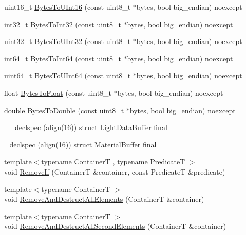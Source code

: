 \begin{DoxyCompactItemize}
\item 
uint16\+\_\+t \hyperlink{namespacemage_a5d362d71af09a61b69a77650037528a9}{Bytes\+To\+U\+Int16} (const uint8\+\_\+t $\ast$bytes, bool big\+\_\+endian) noexcept
\item 
int32\+\_\+t \hyperlink{namespacemage_a2262f4113dd6a3ec00789044d5408f78}{Bytes\+To\+Int32} (const uint8\+\_\+t $\ast$bytes, bool big\+\_\+endian) noexcept
\item 
uint32\+\_\+t \hyperlink{namespacemage_af9a93f8769633506fe457fc60d309540}{Bytes\+To\+U\+Int32} (const uint8\+\_\+t $\ast$bytes, bool big\+\_\+endian) noexcept
\item 
int64\+\_\+t \hyperlink{namespacemage_a0d8c7ac6d7820cf7d66eb80fb3dc2b74}{Bytes\+To\+Int64} (const uint8\+\_\+t $\ast$bytes, bool big\+\_\+endian) noexcept
\item 
uint64\+\_\+t \hyperlink{namespacemage_a59898cc480f29908c8e015c8aef5d342}{Bytes\+To\+U\+Int64} (const uint8\+\_\+t $\ast$bytes, bool big\+\_\+endian) noexcept
\item 
float \hyperlink{namespacemage_a0a2e3f535427f52fb248afbbaebdc610}{Bytes\+To\+Float} (const uint8\+\_\+t $\ast$bytes, bool big\+\_\+endian) noexcept
\item 
double \hyperlink{namespacemage_ae0813ad421fca47762e1c6b5b4f78ae7}{Bytes\+To\+Double} (const uint8\+\_\+t $\ast$bytes, bool big\+\_\+endian) noexcept
\item 
\hyperlink{namespacemage_acb52a2b7136d871548446f56ecb1b36c}{\+\_\+\+\_\+declspec} (align(16)) struct Light\+Data\+Buffer final
\item 
\hyperlink{namespacemage_a76dac28d69746bdef408a08c36a7c862}{\+\_\+declspec} (align(16)) struct Material\+Buffer final
\item 
{\footnotesize template$<$typename ContainerT , typename PredicateT $>$ }\\void \hyperlink{namespacemage_a403ff95eb779de1fbbf139661feb2d1b}{Remove\+If} (ContainerT \&container, const PredicateT \&predicate)
\item 
{\footnotesize template$<$typename ContainerT $>$ }\\void \hyperlink{namespacemage_a56c8c38aee820faf885024ed22e70a8e}{Remove\+And\+Destruct\+All\+Elements} (ContainerT \&container)
\item 
{\footnotesize template$<$typename ContainerT $>$ }\\void \hyperlink{namespacemage_aa3db059e4b0563e46cdf3a3a369c3288}{Remove\+And\+Destruct\+All\+Second\+Elements} (ContainerT \&container)
\item 

\end{DoxyCompactItemize}
